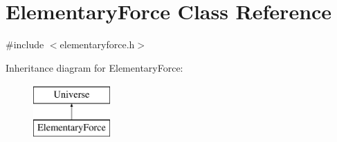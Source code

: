 \hypertarget{classElementaryForce}{}\section{Elementary\+Force Class Reference}
\label{classElementaryForce}


{\ttfamily \#include $<$elementaryforce.\+h$>$}

Inheritance diagram for Elementary\+Force\+:\begin{figure}[H]
\begin{center}
\leavevmode
\includegraphics[height=2.000000cm]{classElementaryForce}
\end{center}
\end{figure}
